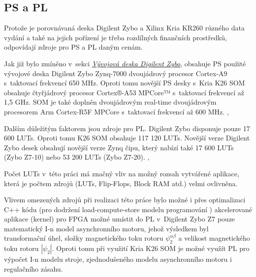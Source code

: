 \documentclass[a4paper, twoside, 11pt]{article}
\begin{document}
			\subsection{PS a PL}\label{subsec:ps-a-pl}
					Protože je porovnávaná deska Digilent Zybo a Xilinx Kria KR260 různého data vydání a také na jejich pořízení je třeba rozdílných finančních prostředků, odpovídají zdroje pro PS a PL daným cenám.\par
					Jak již bylo zmíněno v~sekci \hyperref[sec:vyvojova-deska-digilent-zybo]{\textit{Vývojová deska Digilent Zybo}}, obsahuje PS použité vývojové deska Digilent Zybo Zynq-7000 dvoujádrový procesor Cortex-A9 s~taktovací frekvencí 650 MHz. Oproti tomu novější PS desky s~Kria K26 SOM obsahuje čtyřjádrový procesor Cortex®-A53 MPCore™ s~taktovací frekvencí až 1,5 GHz. SOM je také doplněn dvoujádrovým real-time dvoujádrovým procesorem Arm Cortex-R5F MPCore s~taktovací frekvencí až 600 MHz. \cite{digilent-zybo-reference-manual}, \cite{kria-k26-som-ds}\par
					Dalším důležitým faktorem jsou zdroje pro PL. Digilent Zybo disponuje pouze 17 600 LUTs. Oproti tomu K26 SOM obsahuje 117 120 LUTs. Novější verze Digilent Zybo desek obsahují novější verze Zynq čipu, který nabízí také 17 600 LUTs (Zybo Z7-10) nebo 53 200 LUTs (Zybo Z7-20). \cite{digilent-zybo-reference-manual}, \cite{kria-k26-som-ds}\par
					Počet LUTs v~této práci má značný vliv na možný rozsah vytvářené aplikace, která je počtem zdrojů (LUTs, Flip-Flops, Block RAM atd.) velmi ovlivněna.\par
					Vlivem omezených zdrojů při realizaci této práce bylo možné i přes optimalizaci C++ kódu (pro dodržení load-compute-store modelu programování \cite{vitis-unified-software-platform-documentation-2022}) akcelerované aplikace (kernel) pro FPGA možné umístit do PL v~Digilent Zybo Z7 pouze matematický I-n model asynchronního motoru, jehož výsledkem byl transformační úhel, složky magnetického toku rotoru $\psi_2^{\alpha \beta}$ a velikost magnetického toku rotoru $| \psi_2 |$. Oproti tomu při využití Kria K26 SOM je možné využít PL pro výpočet I-n modelu stroje, zjednodušeného modelu asynchronního motoru i regulačního zásahu.
\end{document}
